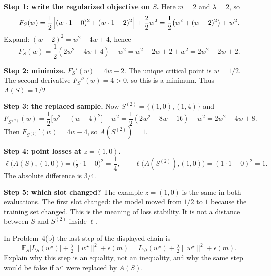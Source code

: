 \begin{solution}
\textbf{Step 1: write the regularized objective on $S$.}
Here $m=2$ and $\lambda=2$, so
\[
F_S(w)
=
\frac12\Bigl[(w\cdot 1-0)^2+(w\cdot 1-2)^2\Bigr]
+
\frac{2}{2}w^2
=
\frac12\bigl(w^2+(w-2)^2\bigr)+w^2.
\]
Expand: $(w-2)^2=w^2-4w+4$, hence
\[
F_S(w)
=
\frac12(2w^2-4w+4)+w^2
=
w^2-2w+2+w^2
=
2w^2-2w+2.
\]

\textbf{Step 2: minimize.}
$F_S'(w)=4w-2$. The unique critical point is $w=1/2$. The second derivative $F_S''(w)=4>0$, so this is a minimum. Thus $A(S)=1/2$.

\textbf{Step 3: the replaced sample.}
Now $S^{(2)}=\{(1,0),(1,4)\}$ and
\[
F_{S^{(2)}}(w)
=
\frac12\bigl[w^2+(w-4)^2\bigr]+w^2
=
\frac12(2w^2-8w+16)+w^2
=
2w^2-4w+8.
\]
Then $F_{S^{(2)}}'(w)=4w-4$, so $A(S^{(2)})=1$.

\textbf{Step 4: point losses at $z=(1,0)$.}
\[
\ell\bigl(A(S),(1,0)\bigr)
=
\bigl(\tfrac12\cdot 1-0\bigr)^2
=
\frac14,
\qquad
\ell\bigl(A(S^{(2)}),(1,0)\bigr)
=
(1\cdot 1-0)^2
=
1.
\]
The absolute difference is $3/4$.

\textbf{Step 5: which slot changed?}
The example $z=(1,0)$ is the same in both evaluations. The first slot changed: the model moved from $1/2$ to $1$ because the training set changed. This is the meaning of loss stability. It is not a distance between $S$ and $S^{(2)}$ inside $\ell$.
\end{solution}

\begin{exercise}
\label{ex:mlu-last-eq}
In Problem~4(b) the last step of the displayed chain is
\[
\mathbb{E}_S\bigl[L_S(w^\star)\bigr]+\tfrac{\lambda}{2}\lVert w^\star\rVert^2+\epsilon(m)
=
L_{\mathcal{D}}(w^\star)+\tfrac{\lambda}{2}\lVert w^\star\rVert^2+\epsilon(m).
\]
Explain why this step is an equality, not an inequality, and why the same step would be false if $w^\star$ were replaced by $A(S)$.
\end{exercise}

